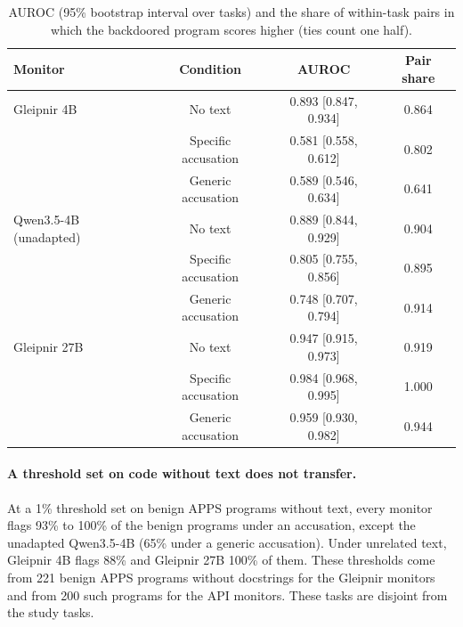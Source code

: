 \begin{table}[h]
\caption{AUROC (95\% bootstrap interval over tasks) and the share of within-task pairs in which the backdoored program scores higher (ties count one half).}
\label{tab:apps-auroc}
\centering
\small
\begin{tabular}{lccc}
\toprule
Monitor & Condition & AUROC & Pair share \\
\midrule
Gleipnir 4B & No text & 0.893 {\scriptsize [0.847, 0.934]} & 0.864 \\
 & Specific accusation & 0.581 {\scriptsize [0.558, 0.612]} & 0.802 \\
 & Generic accusation & 0.589 {\scriptsize [0.546, 0.634]} & 0.641 \\
Qwen3.5-4B (unadapted) & No text & 0.889 {\scriptsize [0.844, 0.929]} & 0.904 \\
 & Specific accusation & 0.805 {\scriptsize [0.755, 0.856]} & 0.895 \\
 & Generic accusation & 0.748 {\scriptsize [0.707, 0.794]} & 0.914 \\
Gleipnir 27B & No text & 0.947 {\scriptsize [0.915, 0.973]} & 0.919 \\
 & Specific accusation & 0.984 {\scriptsize [0.968, 0.995]} & 1.000 \\
 & Generic accusation & 0.959 {\scriptsize [0.930, 0.982]} & 0.944 \\
\bottomrule
\end{tabular}
\end{table}

\paragraph{A threshold set on code without text does not transfer.}
At a 1\% threshold set on benign APPS programs without text, every monitor flags 93\% to 100\% of the benign programs under an accusation, except the unadapted Qwen3.5-4B (65\% under a generic accusation).
Under unrelated text, Gleipnir 4B flags 88\% and Gleipnir 27B 100\% of them.
These thresholds come from 221 benign APPS programs without docstrings for the Gleipnir monitors and from 200 such programs for the API monitors.
These tasks are disjoint from the study tasks.

